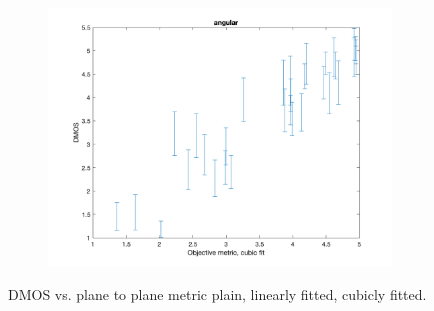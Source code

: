 \documentclass{article}
\begin{document}
\begin{figure}
   \begin{subfigure}[b]{0.65\textwidth}
   \includegraphics[width=\textwidth]{Figures/task3/angular_cubic.png}
   \end{subfigure}
    \caption{DMOS vs. plane to plane metric plain, linearly fitted, cubicly fitted.}
    \label{fig:angular_fitted}
\end{figure}
\end{document}
